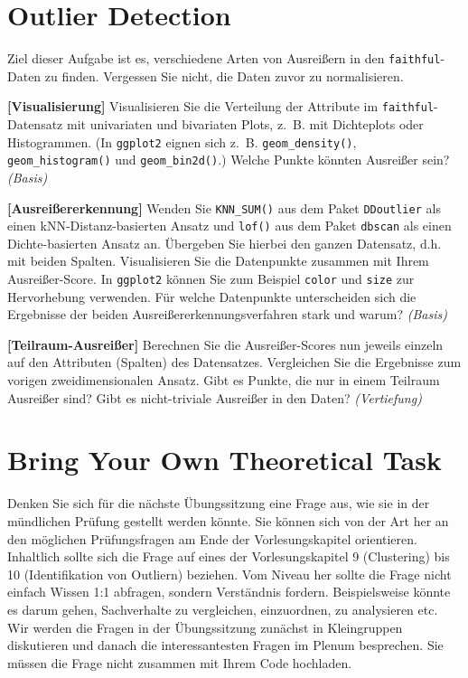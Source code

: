 \documentclass[headinclude,headsepline]{scrartcl}
\newcommand{\taskcategory}[1]{{\color[HTML]{800000}\emph{(#1)}}}
\newcommand{\taskname}[1]{\textbf{[#1]}}
\newcommand{\code}[1]{{\color[HTML]{000080}\texttt{#1}}}
\begin{document}
\section{Outlier Detection}

Ziel dieser Aufgabe ist es, verschiedene Arten von Ausreißern in den \code{faithful}-Daten zu finden.
Vergessen Sie nicht, die Daten zuvor zu normalisieren.

\vspace{10pt}
\begin{compactenum}[a)]\itemsep10pt
	\item
	\taskname{Visualisierung}
	Visualisieren Sie die Verteilung der Attribute im \code{faithful}-Datensatz mit univariaten und bivariaten Plots, z.~B. mit Dichteplots oder Histogrammen.
	(In \code{ggplot2} eignen sich z.~B. \code{geom\_density()}, \code{geom\_histogram()} und \code{geom\_bin2d()}.)
	Welche Punkte könnten Ausreißer sein?
	\taskcategory{Basis}
	\item
	\taskname{Ausreißererkennung}
	Wenden Sie \code{KNN\_SUM()} aus dem Paket \code{DDoutlier} als einen kNN-Distanz-basierten Ansatz und \code{lof()} aus dem Paket \code{dbscan} als einen Dichte-basierten Ansatz an.
	Übergeben Sie hierbei den ganzen Datensatz, d.h. mit beiden Spalten.
	Visualisieren Sie die Datenpunkte zusammen mit Ihrem Ausreißer-Score.
	In \code{ggplot2} können Sie zum Beispiel \code{color} und \code{size} zur Hervorhebung verwenden.
	Für welche Datenpunkte unterscheiden sich die Ergebnisse der beiden Ausreißererkennungsverfahren stark und warum?
	\taskcategory{Basis}
	\item
	\taskname{Teilraum-Ausreißer}
	Berechnen Sie die Ausreißer-Scores nun jeweils einzeln auf den Attributen (Spalten) des Datensatzes.
	Vergleichen Sie die Ergebnisse zum vorigen zweidimensionalen Ansatz.
	Gibt es Punkte, die nur in einem Teilraum Ausreißer sind?
	Gibt es nicht-triviale Ausreißer in den Daten?
	\taskcategory{Vertiefung}
\end{compactenum}

\section{Bring Your Own Theoretical Task}

Denken Sie sich für die nächste Übungssitzung eine Frage aus, wie sie in der mündlichen Prüfung gestellt werden könnte.
Sie können sich von der Art her an den möglichen Prüfungs\-fragen am Ende der Vorlesungskapitel orientieren.
Inhaltlich sollte sich die Frage auf eines der Vorlesungskapitel 9 (Clustering) bis 10 (Identifikation von Outliern) beziehen.
Vom Niveau her sollte die Frage nicht einfach Wissen 1:1 abfragen, sondern Verständnis fordern.
Beispielsweise könnte es darum gehen, Sachverhalte zu vergleichen, einzuordnen, zu analysieren etc.
Wir werden die Fragen in der Übungssitzung zunächst in Kleingruppen diskutieren und danach die interessantesten Fragen im Plenum besprechen.
Sie müssen die Frage nicht zusammen mit Ihrem Code hochladen.
\end{document}
